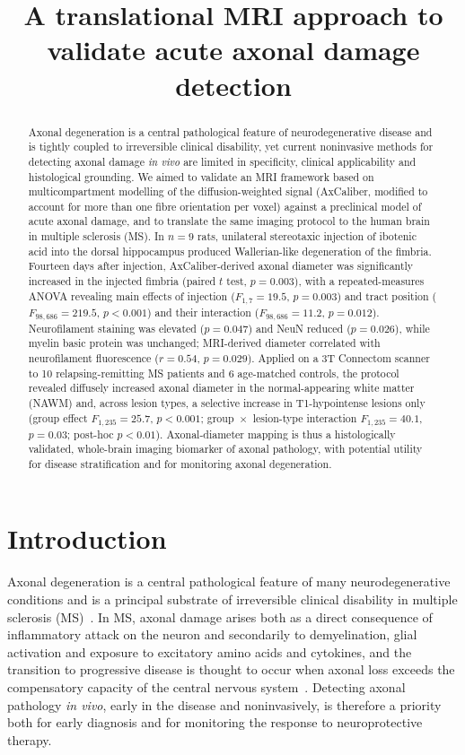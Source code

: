 \documentclass[11pt]{article}
\title{A translational MRI approach to validate acute axonal damage detection}
\date{}
\begin{document}
\maketitle

\begin{abstract}
Axonal degeneration is a central pathological feature of neurodegenerative disease and is tightly coupled to irreversible clinical disability, yet current noninvasive methods for detecting axonal damage \emph{in vivo} are limited in specificity, clinical applicability and histological grounding. We aimed to validate an MRI framework based on multicompartment modelling of the diffusion-weighted signal (AxCaliber, modified to account for more than one fibre orientation per voxel) against a preclinical model of acute axonal damage, and to translate the same imaging protocol to the human brain in multiple sclerosis (MS). In $n=9$ rats, unilateral stereotaxic injection of ibotenic acid into the dorsal hippocampus produced Wallerian-like degeneration of the fimbria. Fourteen days after injection, AxCaliber-derived axonal diameter was significantly increased in the injected fimbria (paired $t$ test, $p=0.003$), with a repeated-measures ANOVA revealing main effects of injection ($F_{1,7}=19.5$, $p=0.003$) and tract position ($F_{98,686}=219.5$, $p<0.001$) and their interaction ($F_{98,686}=11.2$, $p=0.012$). Neurofilament staining was elevated ($p=0.047$) and NeuN reduced ($p=0.026$), while myelin basic protein was unchanged; MRI-derived diameter correlated with neurofilament fluorescence ($r=0.54$, $p=0.029$). Applied on a 3T Connectom scanner to 10 relapsing-remitting MS patients and 6 age-matched controls, the protocol revealed diffusely increased axonal diameter in the normal-appearing white matter (NAWM) and, across lesion types, a selective increase in T1-hypointense lesions only (group effect $F_{1,235}=25.7$, $p<0.001$; group~$\times$~lesion-type interaction $F_{1,235}=40.1$, $p=0.03$; post-hoc $p<0.01$). Axonal-diameter mapping is thus a histologically validated, whole-brain imaging biomarker of axonal pathology, with potential utility for disease stratification and for monitoring axonal degeneration.
\end{abstract}

\section{Introduction}

Axonal degeneration is a central pathological feature of many neurodegenerative conditions and is a principal substrate of irreversible clinical disability in multiple sclerosis (MS)~\cite{criste2014axonal,haines2011axonal}. In MS, axonal damage arises both as a direct consequence of inflammatory attack on the neuron and secondarily to demyelination, glial activation and exposure to excitatory amino acids and cytokines, and the transition to progressive disease is thought to occur when axonal loss exceeds the compensatory capacity of the central nervous system~\cite{criste2014axonal}. Detecting axonal pathology \emph{in vivo}, early in the disease and noninvasively, is therefore a priority both for early diagnosis and for monitoring the response to neuroprotective therapy.
\end{document}
